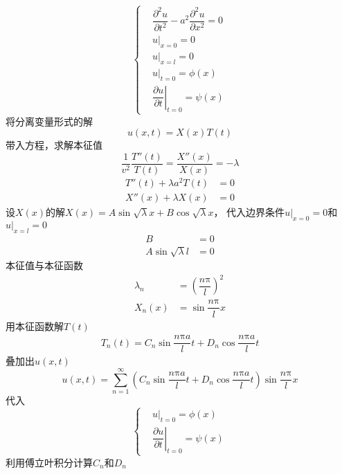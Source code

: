 \documentclass{article}
\begin{document}
\begin{equation*}
  \left\{
  \begin{aligned}
    & \dfrac{\partial^{2} u}{\partial t^{2}} - a^{2} \dfrac{\partial^{2} u}{\partial x^{2}} = 0 \\
    & u |_{x=0} = 0\\
    & u |_{x=l} = 0\\
    & u |_{t=0} = \phi (x)\\
    & \!\!\left. \dfrac{\partial u}{\partial t} \right|_{t=0} = \psi (x)
  \end{aligned}
  \right.
\end{equation*}
将分离变量形式的解
\begin{equation*}
  u(x,t) = X(x) T(t)
\end{equation*}
带入方程，求解本征值
\begin{equation*}
  \dfrac{1}{v^{2}} \dfrac{T''(t)}{T(t)} = \dfrac{X''(x)}{X(x)} = -\lambda
\end{equation*}
\begin{equation*}
  \begin{aligned}
    T''(t) + \lambda a^{2} T(t) &= 0\\
    X''(x) + \lambda X(x) &= 0
  \end{aligned}
\end{equation*}
设$X(x)$的解$X(x) = A \sin \sqrt{\lambda} x + B \cos \sqrt{\lambda}x$，
代入边界条件$u|_{x=0}=0$和$u|_{x=l} = 0$
\begin{equation*}
  \begin{aligned}
    B &= 0\\
    A \sin \sqrt{\lambda}l &= 0
  \end{aligned}
\end{equation*}
本征值与本征函数
\begin{equation*}
  \begin{aligned}
    \lambda_{n} &= \left( \dfrac{n \mathrm{\pi}}{l}  \right)^{2}\\
    X_{n}(x) &= \sin \dfrac{n \mathrm{\pi}}{l} x
  \end{aligned}
\end{equation*}
用本征函数解$T(t)$
\begin{equation*}
  \begin{aligned}
    T_{n}(t) = C_{n} \sin \dfrac{n \mathrm{\pi} a}{l}t + D_{n} \cos \dfrac{n \mathrm{\pi} a}{l}t
  \end{aligned}
\end{equation*}
叠加出$u(x,t)$
\begin{equation*}
  u(x,t) = \sum_{n=1}^{\infty} \left( C_{n} \sin \dfrac{n \mathrm{\pi} a}{l}t + D_{n} \cos \dfrac{n \mathrm{\pi} a}{l}t \right)  \sin \dfrac{n \mathrm{\pi}}{l}x 
\end{equation*}
代入
\begin{equation*}
  \left\{
  \begin{aligned}
    & u |_{t=0} = \phi (x)\\
    & \!\!\left. \dfrac{\partial u}{\partial t} \right|_{t=0} = \psi (x)
  \end{aligned}
  \right.
\end{equation*}
利用傅立叶积分计算$C_{n}$和$D_{n}$
\end{document}
